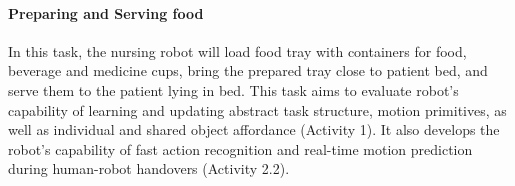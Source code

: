 \documentclass[letterpaper, 11 pt, onecolumn]{article}
\begin{document}
\paragraph*{Preparing and Serving food} In this task, the nursing robot will load food tray with containers for food, beverage and medicine cups, bring the prepared tray close to patient bed, and serve them to the patient lying in bed. This task aims to evaluate robot's capability of learning and updating abstract task structure, motion primitives, as well as individual and shared object affordance (Activity 1). It also develops the robot's capability of fast action recognition and real-time motion prediction during human-robot handovers (Activity 2.2). 










\end{document}
